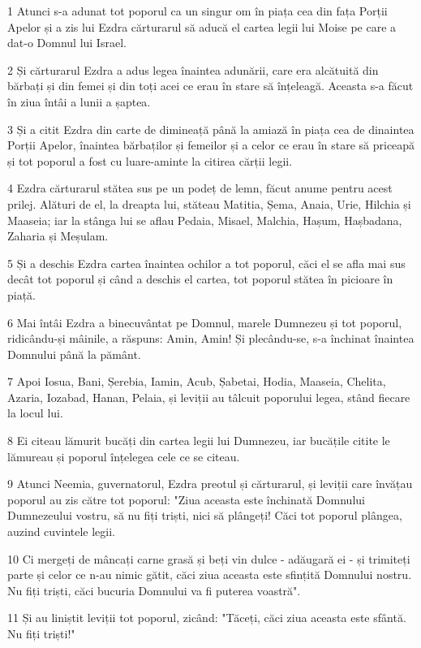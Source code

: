 \par 1 Atunci s-a adunat tot poporul ca un singur om în piața cea din fața Porții Apelor și a zis lui Ezdra cărturarul să aducă el cartea legii lui Moise pe care a dat-o Domnul lui Israel.
\par 2 Și cărturarul Ezdra a adus legea înaintea adunării, care era alcătuită din bărbați și din femei și din toți acei ce erau în stare să înțeleagă. Aceasta s-a făcut în ziua întâi a lunii a șaptea.
\par 3 Și a citit Ezdra din carte de dimineață până la amiază în piața cea de dinaintea Porții Apelor, înaintea bărbaților și femeilor și a celor ce erau în stare să priceapă și tot poporul a fost cu luare-aminte la citirea cărții legii.
\par 4 Ezdra cărturarul stătea sus pe un podeț de lemn, făcut anume pentru acest prilej. Alături de el, la dreapta lui, stăteau Matitia, Șema, Anaia, Urie, Hilchia și Maaseia; iar la stânga lui se aflau Pedaia, Misael, Malchia, Hașum, Hașbadana, Zaharia și Meșulam.
\par 5 Și a deschis Ezdra cartea înaintea ochilor a tot poporul, căci el se afla mai sus decât tot poporul și când a deschis el cartea, tot poporul stătea în picioare în piață.
\par 6 Mai întâi Ezdra a binecuvântat pe Domnul, marele Dumnezeu și tot poporul, ridicându-și mâinile, a răspuns: Amin, Amin! Și plecându-se, s-a închinat înaintea Domnului până la pământ.
\par 7 Apoi Iosua, Bani, Șerebia, Iamin, Acub, Șabetai, Hodia, Maaseia, Chelita, Azaria, Iozabad, Hanan, Pelaia, și leviții au tâlcuit poporului legea, stând fiecare la locul lui.
\par 8 Ei citeau lămurit bucăți din cartea legii lui Dumnezeu, iar bucățile citite le lămureau și poporul înțelegea cele ce se citeau.
\par 9 Atunci Neemia, guvernatorul, Ezdra preotul și cărturarul, și leviții care învățau poporul au zis către tot poporul: "Ziua aceasta este închinată Domnului Dumnezeului vostru, să nu fiți triști, nici să plângeți! Căci tot poporul plângea, auzind cuvintele legii.
\par 10 Ci mergeți de mâncați carne grasă și beți vin dulce - adăugară ei - și trimiteți parte și celor ce n-au nimic gătit, căci ziua aceasta este sfințită Domnului nostru. Nu fiți triști, căci bucuria Domnului va fi puterea voastră".
\par 11 Și au liniștit leviții tot poporul, zicând: "Tăceți, căci ziua aceasta este sfântă. Nu fiți triști!"
